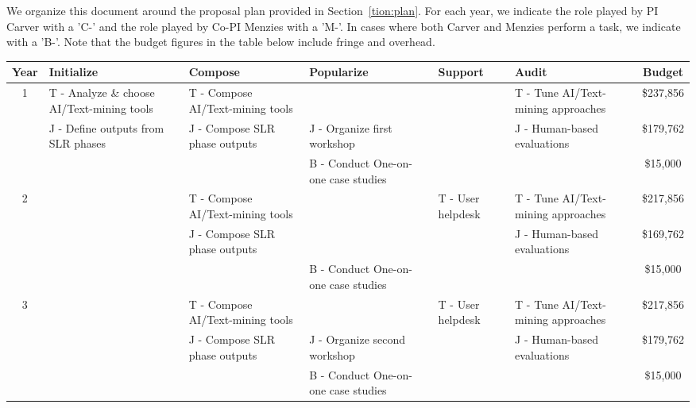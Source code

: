 We organize this document around the proposal plan provided in Section~\ref{tion:plan}.
For each year, we indicate the role played by PI Carver with a 'C-' and the role played by Co-PI Menzies with a 'M-'. 
In cases where both Carver and Menzies perform a task, we indicate with a 'B-'.
Note that the budget figures in the table below include fringe and overhead.

\vspace{16pt}

\noindent
\begin{tabular}{c|p{}|p{}|p{}|p{}|p{}|c}
        \textbf{Year} & \textbf{Initialize} & \textbf{Compose} & \textbf{Popularize} & \textbf{Support} & \textbf{Audit} & \textbf{Budget} \\
        \hline
        \multirow{3}{*}{1} & T - Analyze \& choose AI/Text-mining tools & T - Compose AI/Text-mining tools & & & T - Tune AI/Text-mining approaches & \$237,856 \\
        \cline{2-7}
        & J - Define outputs from SLR phases &  J - Compose SLR phase outputs & J - Organize first workshop & & J - Human-based evaluations & \$179,762 \\
        \cline{2-7}
        & & & B - Conduct One-on-one case studies & &  & \$15,000 \\
        \hline
        \multirow{3}{*}{2} & & T - Compose AI/Text-mining tools & & T - User helpdesk & T - Tune AI/Text-mining approaches & \$217,856 \\
        \cline{2-7}
        &  &  J - Compose SLR phase outputs & & & J - Human-based evaluations & \$169,762 \\
        \cline{2-7}
        & & & B - Conduct One-on-one case studies & & & \$15,000 \\
        \hline
        \multirow{3}{*}{3} & & T - Compose AI/Text-mining tools & & T - User helpdesk & T - Tune AI/Text-mining approaches & \$217,856 \\
        \cline{2-7}
        & &  J - Compose SLR phase outputs & J - Organize second workshop & & J - Human-based evaluations & \$179,762 \\
        \cline{2-7}
        & & & B - Conduct One-on-one case studies & &  & \$15,000 \\
    \end{tabular}
